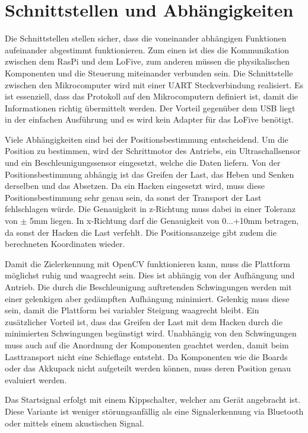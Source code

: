 \documentclass[a4paper]{report}
\begin{document}
\section{Schnittstellen und Abhängigkeiten}
\label{sec:SchnittAbhang}
Die Schnittstellen stellen sicher, dass die voneinander abhängigen Funktionen aufeinander abgestimmt funktionieren. Zum einen ist dies die Kommunikation zwischen dem RasPi und dem LoFive, zum anderen müssen die physikalischen Komponenten und die Steuerung miteinander verbunden sein. Die Schnittstelle zwischen den Mikrocomputer wird mit einer UART Steckverbindung realisiert. Es ist essenziell, dass das Protokoll auf den Mikrocomputern definiert ist, damit die Informationen richtig übermittelt werden. Der Vorteil gegenüber dem USB liegt in der einfachen Ausführung und es wird kein Adapter für das LoFive benötigt.

Viele Abhängigkeiten sind bei der Positionsbestimmung entscheidend. Um die Position zu bestimmen, wird der Schrittmotor des Antriebs, ein Ultraschallsensor und ein Beschleunigungssensor eingesetzt, welche die Daten liefern. Von der Positionsbestimmung abhängig ist das Greifen der Last, das Heben und Senken derselben und das Absetzen. Da ein Hacken eingesetzt wird, muss diese Positionsbestimmung sehr genau sein, da sonst der Transport der Last fehlschlagen würde. Die Genauigkeit in z-Richtung muss dabei in einer Toleranz von $\pm$ 5mm liegen. In x-Richtung darf die Genauigkeit von 0...+10mm betragen, da sonst der Hacken die Last verfehlt. Die Positionsanzeige gibt zudem die berechneten Koordinaten wieder.

Damit die Zielerkennung mit OpenCV funktionieren kann, muss die Plattform möglichst ruhig und waagrecht sein. Dies ist abhängig von der Aufhängung und Antrieb. Die durch die Beschleunigung auftretenden Schwingungen werden mit einer gelenkigen aber gedämpften Aufhängung minimiert. Gelenkig muss diese sein, damit die Plattform bei variabler Steigung waagrecht bleibt. Ein zusätzlicher Vorteil ist, dass das Greifen der Last mit dem Hacken durch die minimierten Schwingungen begünstigt wird. Unabhängig von den Schwingungen muss auch auf die Anordnung der Komponenten geachtet werden, damit beim Lasttransport nicht eine Schieflage entsteht. Da Komponenten wie die Boards oder das Akkupack nicht aufgeteilt werden können, muss deren Position genau evaluiert werden.

Das Startsignal erfolgt mit einem Kippschalter, welcher am Gerät angebracht ist. Diese Variante ist weniger störungsanfällig als eine Signalerkennung via Bluetooth oder mittels einem akustischen Signal.
\end{document}
